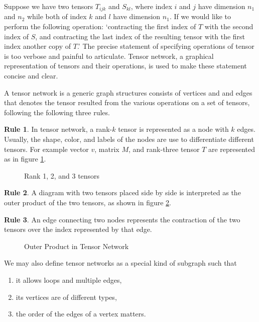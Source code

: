 Suppose we have two tensors $T_{ijk}$ and $S_{kl}$, where index $i $ and $j$ have dimension $n_1$ and $n_2$ while both of index $k$ and $l$ have dimension $n_1$.
If we would like to perform the following operation: `contracting the first index of $T$ with the second index of $S$, and contracting the last index of the resulting tensor with the first index another copy of $T$.' 
The precise statement of specifying operations of tensor is too verbose and painful to articulate.
Tensor network, a graphical representation of tensors and their operations, is used to make these statement concise and clear.

\begin{definition}
	A tensor network is a generic graph structures consists of vertices and and edges that denotes the tensor resulted from the various operations on a set of tensors, following the following three rules.


\textbf{Rule 1}. In tensor network, a rank-$k$ tensor is represented as a node with $k$ edges.
Usually, the shape, color, and labels of the nodes are use to differentiate different tensors.
For example vector $v$, matrix $M$, and rank-three tensor $T$ are represented as in figure \ref{fig:simple_tensors}.

\begin{figure}[ht]
	\centering
	
	\caption{Rank 1, 2, and 3 tensors}
	\label{fig:simple_tensors}
\end{figure}

\textbf{Rule 2}. A diagram with two tensors placed side by side is interpreted as the outer product of the two tensors, as shown in figure \ref{fig:tensor-product}.

\textbf{Rule 3}. An edge connecting two nodes represents the contraction of the two tensors over the index represented by that edge.
\begin{figure}[ht]
	\centering
	
	\caption{Outer Product in Tensor Network}
	\label{fig:tensor-product}
\end{figure}

\end{definition}

We may also define tensor networks as a special kind of subgraph such that
\begin{enumerate}
		\item it allows loops and multiple edges,
		\item its vertices are of different types,
		\item the order of the edges of a vertex matters.
\end{enumerate}

